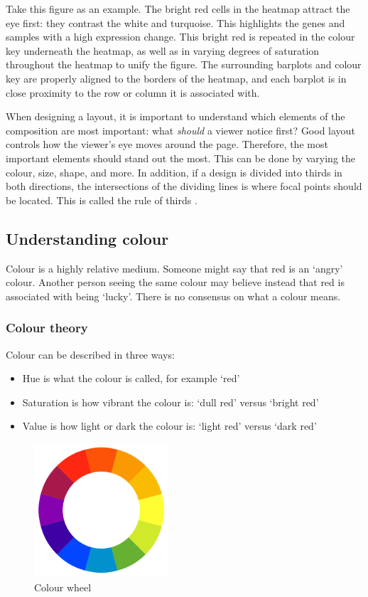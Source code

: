 \documentclass[letterpaper]{report}\usepackage[]{graphicx}\usepackage[]{color}
\begin{document}
Take this figure as an example. The bright red cells in the heatmap attract the eye first: they contrast the white and turquoise. This highlights the genes and samples with a high expression change. This bright red is repeated in the colour key underneath the heatmap, as well as in varying degrees of saturation throughout the heatmap to unify the figure. The surrounding barplots and colour key are properly aligned to the borders of the heatmap, and each barplot is in close proximity to the row or column it is associated with. 

When designing a layout, it is important to understand which elements of the composition are most important: what \textit{should} a viewer notice first? Good layout controls how the viewer's eye moves around the page. Therefore, the most important elements should stand out the most. This can be done by varying the colour, size, shape, and more. In addition, if a design is divided into thirds in both directions, the intersections of the dividing lines is where focal points should be located. This is called the rule of thirds \cite{wong3}.

\subsection{Understanding colour}
Colour is a highly relative medium. Someone might say that red is an `angry' colour. Another person seeing the same colour may believe instead that red is associated with being `lucky'. There is no consensus on what a colour means. 

\subsubsection{Colour theory}
Colour can be described in three ways:
\begin{itemize}
\item Hue is what the colour is called, for example `red'
\item Saturation is how vibrant the colour is: `dull red' versus `bright red'
\item Value is how light or dark the colour is: `light red' versus `dark red'
\end{itemize}

\begin{figure}[!ht]
  \begin{center}
     \includegraphics[width=50mm]{Figures/colour_wheel.png}
     \caption{Colour wheel}
  \end{center}
\end{figure}
\end{document}
